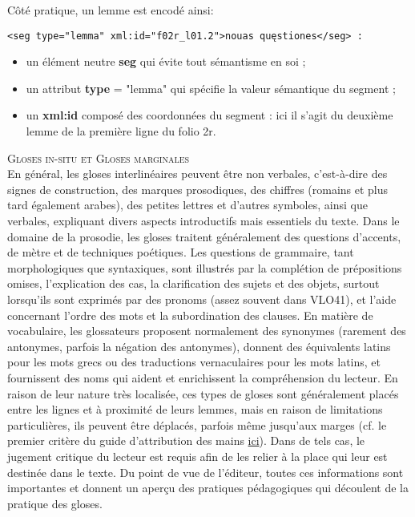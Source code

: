 \documentclass[a4paper, twoside, 12pt]{book}
\begin{document}
Côté pratique, un lemme est encodé ainsi:

\begin{verbatim} 
<seg type="lemma" xml:id="f02r_l01.2">nouas quęstiones</seg> :
\end{verbatim}

\begin{itemize}
    \item un élément neutre \textbf{seg} qui évite tout sémantisme en soi ;
    \item un attribut \textbf{type} = "lemma" qui spécifie la valeur sémantique du segment ;
    \item un \textbf{xml:id} composé des coordonnées du segment : ici il s'agit du deuxième lemme de la première ligne du folio 2r.
\end{itemize}

\textsc{Gloses in-situ et Gloses marginales}\\

En général, les gloses interlinéaires peuvent être non verbales, c'est-à-dire des signes de construction, des marques prosodiques, des chiffres (romains et plus tard également arabes), des petites lettres et d'autres symboles, ainsi que verbales, expliquant divers aspects introductifs mais essentiels du texte. Dans le domaine de la prosodie, les gloses traitent généralement des questions d'accents, de mètre et de techniques poétiques. Les questions de grammaire, tant morphologiques que syntaxiques, sont illustrés par la complétion de prépositions omises, l'explication des cas, la clarification des sujets et des objets, surtout lorsqu'ils sont exprimés par des pronoms (assez souvent dans VLO41), et l'aide concernant l'ordre des mots et la subordination des clauses. En matière de vocabulaire, les glossateurs proposent normalement des synonymes (rarement des antonymes, parfois la négation des antonymes), donnent des équivalents latins pour les mots grecs ou des traductions vernaculaires pour les mots latins, et fournissent des noms qui aident et enrichissent la compréhension du lecteur. En raison de leur nature très localisée, ces types de gloses sont généralement placés entre les lignes et à proximité de leurs lemmes, mais en raison de limitations particulières, ils peuvent être déplacés, parfois même jusqu'aux marges (cf. le premier critère du guide d'attribution des mains \href{https://github.com/malamatenia/Eutyches/blob/main/hand_attribution_guide.pdf}{ici}). Dans de tels cas, le jugement critique du lecteur est requis afin de les relier à la place qui leur est destinée dans le texte. Du point de vue de l'éditeur, toutes ces informations sont importantes et donnent un aperçu des pratiques pédagogiques qui découlent de la pratique des gloses.\\
\end{document}
